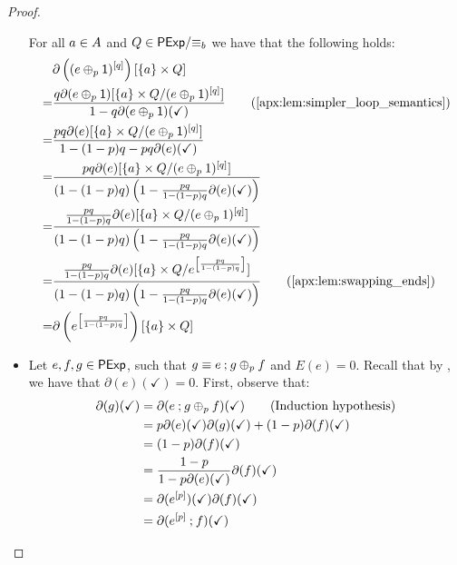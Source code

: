 \begin{proof}
\begin{itemize}[leftmargin=0em]
        For all $a \in {A}$ and $Q \in {\mathsf{PExp}}/{\equiv_b}$ we have that the following holds:
        \begin{align*}
            &\partial \left( (e \oplus_p \one)^{[q]}\right)[\{a\} \times Q]\\
            =& \frac{q\partial(e \oplus_p \one)[\{a\} \times {Q}/{(e \oplus_p \one)^{[q]}}]}{1-q\partial(e \oplus_p \one)(\checkmark)} \tag{\Cref{apx:lem:simpler_loop_semantics}} \\
            =& \frac{pq\partial(e)[\{a\} \times {Q}/{(e \oplus_p \one)^{[q]}}]}{1-(1-p)q-pq\partial(e)(\checkmark)} \\
            =& \frac{pq\partial(e)[\{a\} \times {Q}/{(e \oplus_p 1)^{[q]}}]}{(1-(1-p)q)\left(1-\frac{pq}{1-(1-p)q}\partial(e)(\checkmark)\right)} \\
            =& \frac{\frac{pq}{1-(1-p)q}\partial(e)[\{a\} \times {Q}/{(e \oplus_p 1)^{[q]}}]}{(1-(1-p)q)\left(1-\frac{pq}{1-(1-p)q}\partial(e)(\checkmark)\right)} \\
            =& \frac{\frac{pq}{1-(1-p)q}\partial(e)[\{a\} \times {Q}/{e^{\left[\frac{pq}{1-(1-p)q}\right]}}]}{(1-(1-p)q)\left(1-\frac{pq}{1-(1-p)q}\partial(e)(\checkmark)\right)} \tag{\Cref{apx:lem:swapping_ends}}\\
            =&\partial\left(e^{\left[\frac{pq}{1-(1-p)q}\right]}\right)[\{a\} \times Q]
        \end{align*}

        \item[]  Let $e,f,g \in \mathsf{PExp}$, such that $g \equiv e\mathbin{;} g \oplus_p f$ and $E(e) = 0$. Recall that by , we have that $\partial(e)(\checkmark)=0$. First, observe that:
        \begin{align*}
            \partial(g)(\checkmark) &= \partial(e \mathbin{;} g \oplus_p f)(\checkmark) \tag{Induction hypothesis} \\
            &=p \partial(e)(\checkmark)\partial(g)(\checkmark) + (1-p)\partial(f)(\checkmark) \\
            &= (1-p)\partial(f)(\checkmark) \\
            &= \frac{1-p}{1-p\partial(e)(\checkmark)}\partial(f)(\checkmark) \\
            &= \partial(e^{[p]})(\checkmark)\partial(f)(\checkmark)\\
            &= \partial(e^{[p]} \mathbin{;} f)(\checkmark)
        \end{align*}


\end{itemize}
\end{proof}
